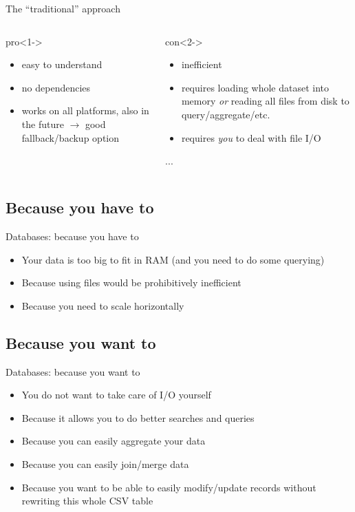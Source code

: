 \documentclass{beamer}
\begin{document}
\begin{frame}{The ``traditional'' approach}
	\begin{columns}[t]
		\begin{block}{pro}<1->
\begin{itemize}
	\item easy to understand
	\item no dependencies
	\item works on all platforms, also in the future $\rightarrow$ good fallback/backup option
\end{itemize}
		\end{block}
		
		\begin{block}{con}<2->
			\begin{itemize}
				\item inefficient
				\item requires loading whole dataset into memory \emph{or} reading all files from disk to query/aggregate/etc.
				\item requires \emph{you} to deal with file I/O
			\end{itemize}...
		\end{block}
	\end{columns}
\end{frame}



\subsection{Because you have to}

\begin{frame}[<+->]{Databases: because you have to}
	\begin{itemize}
		\item Your data is too big to fit in RAM (and you need to do some querying)
		\item Because using files would be prohibitively inefficient
		\item Because you need to scale horizontally
	\end{itemize}
\end{frame}


\subsection{Because you want to}


\begin{frame}[<+->]{Databases: because you want to}
	\begin{itemize}
		\item You do not want to take care of I/O yourself
		\item Because it allows you to do better searches and queries
		\item Because you can easily aggregate your data
		\item Because you can easily join/merge data
		\item Because you want to be able to easily modify/update records without rewriting this whole CSV table
	\end{itemize}
\end{frame}
\end{document}
